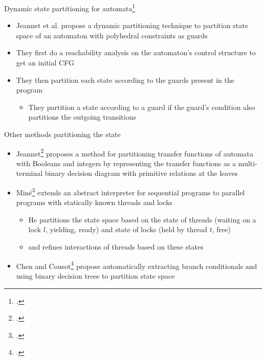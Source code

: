 \documentclass[aspectratio=169,notes]{beamer}
\begin{document}
\begin{frame}{Dynamic state partitioning for automata\footcite{jeannet_dynamic_1999}}
  \begin{itemize}[<+->]
  \item Jeannet et al. propose a dynamic partitioning technique to partition state space of an automaton with polyhedral constraints as guards
  \item They first do a reachability analysis on the automaton's control structure to get an initial CFG
  \item They then partition each state according to the guards present in the program
    \begin{itemize}
    \item They partition a state according to a guard if the guard's condition also partitions the outgoing transitions 
    \end{itemize}
  \end{itemize}
\end{frame}

\begin{frame}{Other methods partitioning the state}
  \begin{itemize}[<+->]
  \item Jeannet\footcite{jeannet_representing_2002} proposes a method for partitioning transfer functions of automata with Booleans and integers by representing the transfer functions as a multi-terminal binary decision diagram with primitive relations at the leaves
  \item Miné\footcite{mine2011static} extends an abstract interpreter for sequential programs to parallel programs with statically known threads and locks
    \begin{itemize}
    \item He partitions the state space based on the state of threads (waiting on a lock $l$, yielding, ready) and state of locks (held by thread $t$, free)
    \item  and refines interactions of threads based on these states
    \end{itemize}
  \item Chen and Cousot\footcite{chen2015binary} propose automatically extracting branch conditionals and using binary decision trees to partition state space
  \end{itemize}
\end{frame}
\end{document}
